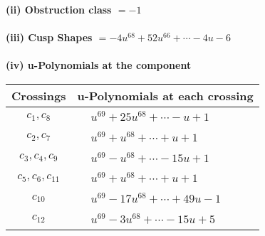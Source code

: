 \documentclass[1p]{elsarticle_modified}
\theoremstyle{definition}
\begin{document}
\flushleft \textbf{(ii) Obstruction class $= -1$}\\~\\
\flushleft \textbf{(iii) Cusp Shapes $= -4 u^{68}+52 u^{66}+\cdots-4 u-6$}\\~\\
\newpage\renewcommand{\arraystretch}{1}
\flushleft \textbf{(iv) u-Polynomials at the component}\newline \\
\begin{tabular}{m{50pt}|m{274pt}}
Crossings & \hspace{64pt}u-Polynomials at each crossing \\
\hline $$\begin{aligned}c_{1},c_{8}\end{aligned}$$&$\begin{aligned}
&u^{69}+25 u^{68}+\cdots- u+1
\end{aligned}$\\
\hline $$\begin{aligned}c_{2},c_{7}\end{aligned}$$&$\begin{aligned}
&u^{69}+u^{68}+\cdots+u+1
\end{aligned}$\\
\hline $$\begin{aligned}c_{3},c_{4},c_{9}\end{aligned}$$&$\begin{aligned}
&u^{69}- u^{68}+\cdots-15 u+1
\end{aligned}$\\
\hline $$\begin{aligned}c_{5},c_{6},c_{11}\end{aligned}$$&$\begin{aligned}
&u^{69}+u^{68}+\cdots+u+1
\end{aligned}$\\
\hline $$\begin{aligned}c_{10}\end{aligned}$$&$\begin{aligned}
&u^{69}-17 u^{68}+\cdots+49 u-1
\end{aligned}$\\
\hline $$\begin{aligned}c_{12}\end{aligned}$$&$\begin{aligned}
&u^{69}-3 u^{68}+\cdots-15 u+5
\end{aligned}$\\
\hline
\end{tabular}\\~\\
\end{document}
